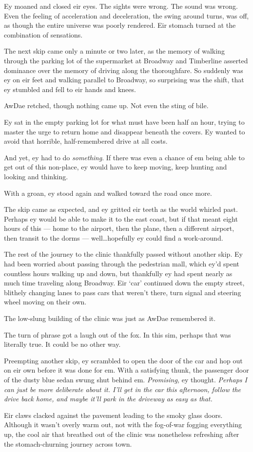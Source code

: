 Ey moaned and closed eir eyes. The sights were wrong. The sound was wrong. Even the feeling of acceleration and deceleration, the swing around turns, was off, as though the entire universe was poorly rendered. Eir stomach turned at the combination of sensations.

The next skip came only a minute or two later, as the memory of walking through the parking lot of the supermarket at Broadway and Timberline asserted dominance over the memory of driving along the thoroughfare. So suddenly was ey on eir feet and walking parallel to Broadway, so surprising was the shift, that ey stumbled and fell to eir hands and knees.

AwDae retched, though nothing came up. Not even the sting of bile.

Ey sat in the empty parking lot for what must have been half an hour, trying to master the urge to return home and disappear beneath the covers. Ey wanted to avoid that horrible, half-remembered drive at all costs.

And yet, ey had to do \emph{something}. If there was even a chance of em being able to get out of this non-place, ey would have to keep moving, keep hunting and looking and thinking.

With a groan, ey stood again and walked toward the road once more.

The skip came as expected, and ey gritted eir teeth as the world whirled past. Perhaps ey would be able to make it to the east coast, but if that meant eight hours of this --- home to the airport, then the plane, then a different airport, then transit to the dorms --- well\ldots{}hopefully ey could find a work-around.

The rest of the journey to the clinic thankfully passed without another skip. Ey had been worried about passing through the pedestrian mall, which ey'd spent countless hours walking up and down, but thankfully ey had spent nearly as much time traveling along Broadway. Eir `car' continued down the empty street, blithely changing lanes to pass cars that weren't there, turn signal and steering wheel moving on their own.

The low-slung building of the clinic was just as AwDae remembered it.

The turn of phrase got a laugh out of the fox. In this sim, perhaps that was literally true. It could be no other way.

Preempting another skip, ey scrambled to open the door of the car and hop out on eir own before it was done for em. With a satisfying thunk, the passenger door of the dusty blue sedan swung shut behind em. \emph{Promising,} ey thought. \emph{Perhaps I can just be more deliberate about it. I'll get in the car this afternoon, follow the drive back home, and maybe it'll park in the driveway as easy as that.}

Eir claws clacked against the pavement leading to the smoky glass doors. Although it wasn't overly warm out, not with the fog-of-war fogging everything up, the cool air that breathed out of the clinic was nonetheless refreshing after the stomach-churning journey across town.
